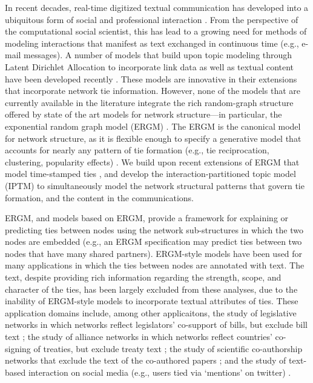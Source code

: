 \documentclass[a4paper]{article}
\begin{document}
In recent decades, real-time digitized textual communication has developed into a ubiquitous form of social and professional interaction \citep[see, e.g.,][]{kanungo2008modeling, szostek2011dealing, burgess2004email, pew2016}. From the perspective of the computational social scientist, this has lead to a growing need for methods of modeling interactions that manifest as text exchanged in continuous time (e.g., e-mail messages). A number of models that build upon topic modeling through Latent Dirichlet Allocation \citep{Blei2003} to incorporate link data as well as textual content have been developed recently \citep{mccallum2005author,lim2013twitter,Krafft2012}. These models are innovative in their extensions that incorporate network tie information. However, none of the models that are currently available in the literature integrate the rich random-graph structure offered by state of the art models for network structure---in particular, the exponential random graph model (ERGM) \citep{robins2007introduction,chatterjee2013estimating,hunter2008ergm}. The ERGM is the canonical model for network structure, as it is flexible enough to specify a generative model that accounts for nearly any pattern of tie formation (e.g., tie reciprocation, clustering, popularity effects) \citep{desmarais2017statistical}. We build upon recent extensions of ERGM that model time-stamped ties \citep{PerryWolfe2012,Butts2008}, and develop the interaction-partitioned topic model (IPTM) to simultaneously model the network structural patterns that govern tie formation, and the content in the communications.

ERGM, and models based on ERGM, provide a framework for explaining or predicting ties between nodes using the network sub-structures in which the two nodes are embedded (e.g., an ERGM specification may predict ties between two nodes that have many shared partners). ERGM-style models have been used for many applications in which the ties between nodes are annotated with text. The text, despite providing rich information regarding the strength, scope, and character of the ties, has been largely excluded from these analyses, due to the inability of ERGM-style models to incorporate textual attributes of ties. These application domains include, among other applicaitons, the study of legislative networks in which networks reflect legislators' co-support of bills, but exclude bill text \citep{bratton2011networks,aleman2013explaining}; the study of alliance networks in which networks reflect countries' co-signing of treaties, but exclude treaty text \citep{camber2010geometry,cranmer2012complex,cranmer2012toward,kinne2016agreeing}; the study of scientific co-authorship networks that exclude the text of the co-authored papers \citep{kronegger2011collaboration,liang2015changing,fahmy2016gender}; and the study of text-based interaction on social media (e.g., users tied via `mentions' on twitter) \citep{yoon2014strategies,peng2016follower,lai2017connecting}.
\end{document}
